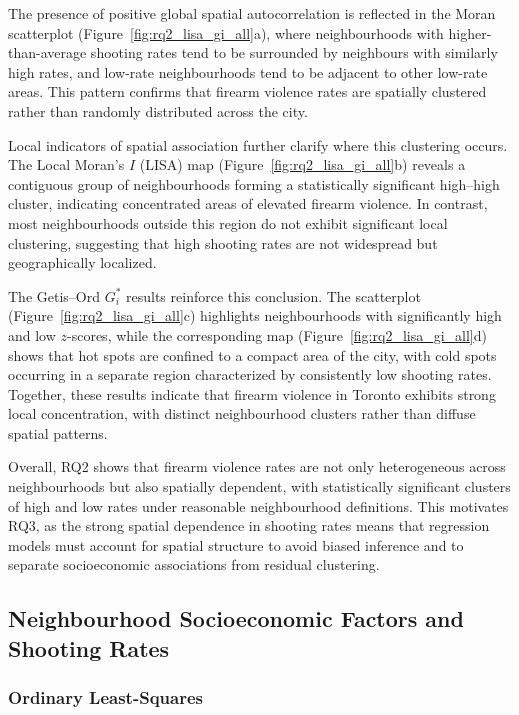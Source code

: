 \documentclass{article}
\begin{document}
\noindent The presence of positive global spatial autocorrelation is reflected in the Moran scatterplot (Figure~\ref{fig:rq2_lisa_gi_all}a), where neighbourhoods with higher-than-average shooting rates tend to be surrounded by neighbours with similarly high rates, and low-rate neighbourhoods tend to be adjacent to other low-rate areas. This pattern confirms that firearm violence rates are spatially clustered rather than randomly distributed across the city.

\noindent Local indicators of spatial association further clarify where this clustering occurs. The Local Moran’s $I$ (LISA) map (Figure~\ref{fig:rq2_lisa_gi_all}b) reveals a contiguous group of neighbourhoods forming a statistically significant high--high cluster, indicating concentrated areas of elevated firearm violence. In contrast, most neighbourhoods outside this region do not exhibit significant local clustering, suggesting that high shooting rates are not widespread but geographically localized.

\noindent The Getis--Ord $G_i^*$ results reinforce this conclusion. The scatterplot (Figure~\ref{fig:rq2_lisa_gi_all}c) highlights neighbourhoods with significantly high and low $z$-scores, while the corresponding map (Figure~\ref{fig:rq2_lisa_gi_all}d) shows that hot spots are confined to a compact area of the city, with cold spots occurring in a separate region characterized by consistently low shooting rates. Together, these results indicate that firearm violence in Toronto exhibits strong local concentration, with distinct neighbourhood clusters rather than diffuse spatial patterns.

\noindent Overall, RQ2 shows that firearm violence rates are not only heterogeneous across neighbourhoods but also spatially dependent, with statistically significant clusters of high and low rates under reasonable neighbourhood definitions. This motivates RQ3, as the strong spatial dependence in shooting rates means that regression models must account for spatial structure to avoid biased inference and to separate socioeconomic associations from residual clustering.

\subsection{Neighbourhood Socioeconomic Factors and Shooting Rates}

\subsubsection{Ordinary Least-Squares}
\end{document}
